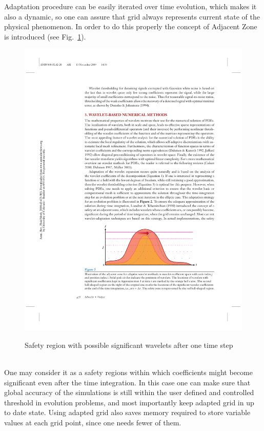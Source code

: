Adaptation procedure can be easily iterated over time evolution, which makes it also a dynamic, so one can assure that grid always represents current state of the physical phenomenon. In order to do this properly the concept of Adjacent Zone is introduced \cite{lib:adjacent} (see Fig.~\ref{fig:wlt_adj}).
\begin{figure}[h!]
\centering \includegraphics[scale=1]{fig/wlt_adj.pdf}\\
\caption{Safety region with possible significant wavelets after one time step \cite{lib:wlt_main} \label{fig:wlt_adj}}
\end{figure}\\
One may consider it as a safety regions within which coefficients might become significant even after the time integration. In this case one can make sure that global accuracy of the simulations is still within the user defined and controlled threshold in evolution problems, and most importantly keep adapted grid in up to date state. Using adapted grid also saves memory required to store variable values at each grid point, since one needs fewer of them.

